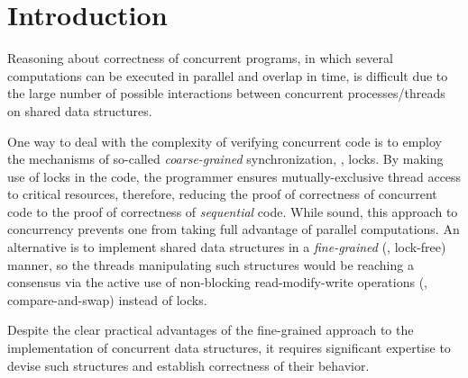 \section{Introduction}
\label{sec:intro}

Reasoning about correctness of concurrent programs, in which several
computations can be executed in parallel and overlap in time, is
difficult due to the large number of possible interactions between
concurrent processes/threads on shared data structures.




One way to deal with the complexity of verifying concurrent code is to
employ the mechanisms of so-called \emph{coarse-grained}
synchronization, \ie, locks. By making use of locks in the code, the
programmer ensures mutually-exclusive thread access to critical
resources, therefore, reducing the proof of correctness of concurrent
code to the proof of correctness of \emph{sequential} code. While
sound, this approach to concurrency prevents one from taking full
advantage of parallel computations. An alternative is to implement
shared data structures in a \emph{fine-grained} (\ie, lock-free)
manner, so the threads manipulating such structures would be reaching
a consensus via the active use of non-blocking read-modify-write
operations (\eg, compare-and-swap) instead of locks.

Despite the clear practical advantages of the fine-grained approach to
the implementation of concurrent data structures, it requires
significant expertise to devise such structures and establish
correctness of their behavior.
%


